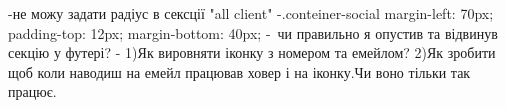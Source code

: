 -не можу задати радіус в сексції "all client"
-.conteiner-social {
  margin-left: 70px;
  padding-top: 12px;
  margin-bottom: 40px;
}- чи правильно я опустив та відвинув секцію у футері?
-
1)Як вировняти іконку з номером та емейлом?
2)Як зробити щоб коли наводиш на емейл працював ховер і на іконку.Чи воно тільки так працює.
